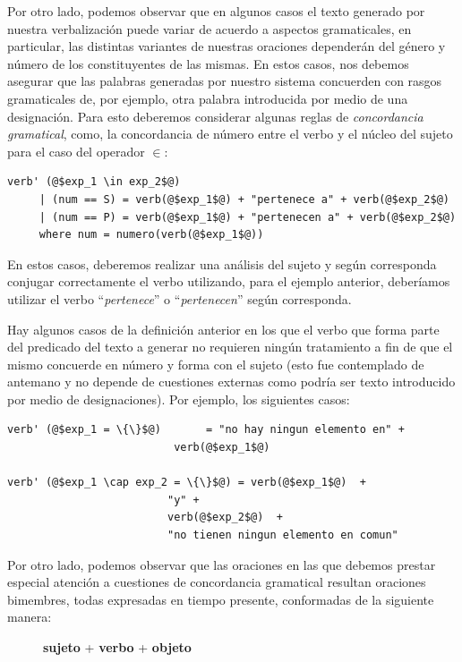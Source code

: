 Por otro lado, podemos observar que en algunos casos el texto generado por nuestra verbalización puede variar de acuerdo a aspectos gramaticales, en particular, las distintas variantes de nuestras oraciones dependerán del género y número de los constituyentes de las mismas. En estos casos, nos debemos asegurar que las palabras generadas por nuestro sistema concuerden con rasgos gramaticales de, por ejemplo, otra palabra introducida por medio de una designación. Para esto deberemos considerar algunas reglas de \emph{concordancia gramatical}, como, la concordancia de número entre el verbo y el núcleo del sujeto para el caso del operador $\in$:


\bigskip
\begin{verbatim}
verb' (@$exp_1 \in exp_2$@)
     | (num == S) = verb(@$exp_1$@) + "pertenece a" + verb(@$exp_2$@) 
     | (num == P) = verb(@$exp_1$@) + "pertenecen a" + verb(@$exp_2$@) 
     where num = numero(verb(@$exp_1$@))
\end{verbatim} 

\bigskip
En estos casos, deberemos realizar una análisis del sujeto y según corresponda conjugar correctamente el verbo utilizando, para el ejemplo anterior, deberíamos utilizar el verbo ``\emph{pertenece}'' o ``\emph{pertenecen}'' según corresponda.

Hay algunos casos de la definición anterior en los que el verbo que forma parte del predicado del texto a generar no requieren ningún tratamiento a fin de que el mismo concuerde en número y forma con el sujeto (esto fue contemplado de antemano y no depende de cuestiones externas como podría ser texto introducido por medio de designaciones). Por ejemplo, los siguientes casos:

\bigskip
\begin{verbatim}
verb' (@$exp_1 = \{\}$@)       = "no hay ningun elemento en" + 
                          verb(@$exp_1$@) 
                                 
verb' (@$exp_1 \cap exp_2 = \{\}$@) = verb(@$exp_1$@)  +  
                         "y" +  
                         verb(@$exp_2$@)  +  
                         "no tienen ningun elemento en comun"
\end{verbatim} 

\bigskip
Por otro lado, podemos observar que las oraciones en las que debemos prestar especial atención a cuestiones de concordancia gramatical resultan oraciones bimembres, todas expresadas en tiempo presente, conformadas de la siguiente manera: 
\begin{figure}[H]
\center
\textbf{sujeto} + \textbf{verbo} + \textbf{objeto}
\end{figure}

